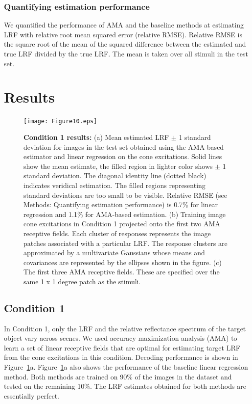 \documentclass{jov}
\begin{document}
\subsubsection*{Quantifying estimation performance}
We quantified the performance of AMA and the baseline methods at estimating LRF with relative root mean squared error (relative RMSE). Relative RMSE is the square root of the mean of the squared difference between the estimated and true LRF divided by the true LRF. The mean is taken over all stimuli in the test set. 

\section{Results} \label{Results}
\begin{figure}
\centering
\texttt{[image: Figure10.eps]}
    \caption{{\bf Condition 1 results:} (a) Mean estimated LRF $\pm$ 1 standard deviation for images in the test set obtained using the AMA-based estimator and linear regression on the cone excitations. Solid lines show the mean estimate, the filled region in lighter color shows $\pm$ 1 standard deviation. The diagonal identity line (dotted black) indicates veridical estimation. The filled regions representing standard deviations are too small to be visible. Relative RMSE (see Methods: Quantifying estimation performance) is 0.7\% for linear regression and 1.1\%  for AMA-based estimation. (b) Training image cone excitations in Condition 1 projected onto the first two AMA receptive fields. Each cluster of responses represents the image patches associated with a particular LRF. The response clusters are approximated by a multivariate Gaussians whose means and covariances are represented by the ellipses shown in the figure. (c) The first three AMA receptive fields. These are specified over the same 1 x 1 degree patch as the stimuli.}
\label{fig:Condition1}
\end{figure}

\subsection{Condition 1}
In Condition 1, only the LRF and the relative reflectance spectrum of the target object vary across scenes.
We used accuracy maximization analysis (AMA) to learn a set of linear receptive fields that are optimal for estimating target LRF from the cone excitations in this condition. 
Decoding performance is shown in Figure~\ref{fig:Condition1}a. 
Figure~\ref{fig:Condition1}a also shows the performance of the baseline linear regression method. 
Both methods are trained on 90\% of the images in the dataset and tested on the remaining 10\%.
The LRF estimates obtained for both methods are essentially perfect.
\end{document}
